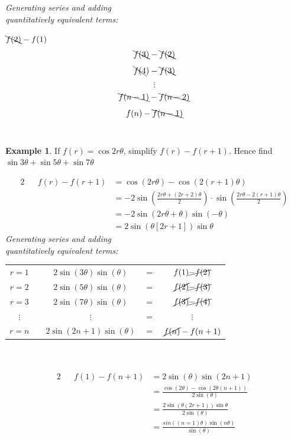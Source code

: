 \documentclass[12pt, a4paper]{report}
\theoremstyle{definition}
\newtheorem{example}{Example}
\begin{document}
	\newpage
	\textit{Generating series and adding}\\
	\textit{quantitatively equivalent terms:}
	\begin{center}
		$\bcancel{f(2)} - f(1)$
		$$\bcancel{f(3)} - \bcancel{f(2)}$$
		$$\bcancel{f(4}) - \bcancel{f(3)}	$$
		$$\vdots$$
		$$\bcancel{f(n-1)} - \bcancel{f(n-2)}$$
		$$f(n) - \bcancel{f(n-1)}$$\\
	\end{center}
	\begin{example}
		If $f(r) = \cos2r\theta$, simplify $f(r) - f(r+1)$. Hence find $\sin3\theta + \sin5\theta + \sin7\theta$
		\hrulefill
	\end{example}
	\begin{alignat*}{2}
		&   & f(r)-f(r+1) & =\cos(2r\theta)- \cos(2(r+1)\theta)                                                                            \\
		&   &             & =-2\sin\left(\frac{2r\theta + (2r+2)\theta}{2}\right)\cdot \sin\left(\frac{ 2r\theta - 2(r+1)\theta}{2}\right) \\
		&   &             & =-2\sin(2r\theta+ \theta)\sin(-\theta)                                                                         \\
		&   &             & =2\sin(\theta[2r+1])\sin\theta                                                                                 
	\end{alignat*}
	\textit{Generating series and adding}\\
	\textit{quantitatively equivalent terms:}\\
	\begin{center}
		
		\begin{tabular}{ccccc}
			$r=1$    &   & $2\sin(3\theta)\sin(\theta)$ & $=$ & $f(1)\cancel{-f(2)}$          \\
			$r=2$    &   & $2\sin(5\theta)\sin(\theta)$ & $=$ & $\cancel{f(2)}\cancel{-f(3)}$ \\
			$r=3$    &   & $2\sin(7\theta)\sin(\theta)$ & $=$ & $\cancel{f(3)}\cancel{-f(4)}$ \\
			$\vdots$ &   & $\vdots$                     & $=$ & $\vdots$                      \\
			$r=n$    &   & $2\sin(2n+1)\sin(\theta)$    & $=$ & $\cancel{f(n)}-f(n+1)$        
		\end{tabular}\\
		~\\
		\begin{alignat*}{2}
			&   & f(1) - f(n+1) & = 2\sin(\theta)\sin(2n+1)                                \\
			&   &               & =\frac{\cos(2\theta)- \cos(2\theta(n+1))}{2\sin(\theta)} \\
			&   &               & =\frac{2\sin(\theta(2r+1))\sin\theta}{2\sin(\theta)}     \\
			&   &               & =\frac{sin((n=1)\theta)\sin(n\theta)}{\sin(\theta)}      
		\end{alignat*}
	\end{center} 
	
\end{document}
